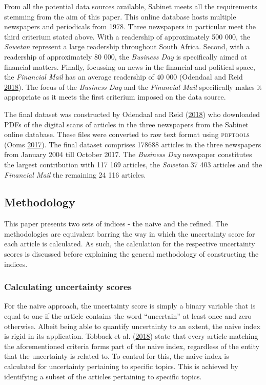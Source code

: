 \documentclass[11pt,preprint, authoryear]{elsarticle}
\numberwithin{equation}{section}
\numberwithin{figure}{section}
\numberwithin{table}{section}
\begin{document}
From all the potential data sources available, Sabinet meets all the
requirements stemming from the aim of this paper. This online database
hosts multiple newspapers and periodicals from 1978. Three newspapers in
particular meet the third criterium stated above. With a readership of
approximately 500 000, the \emph{Sowetan} represent a large readership
throughout South Africa. Second, with a readership of approximately 80
000, the \emph{Business Day} is specifically aimed at financial matters.
Finally, focussing on news in the financial and political space, the
\emph{Financial Mail} has an average readership of 40 000 (Odendaal and
Reid \protect\hyperlink{ref-Odendaal2018}{2018}). The focus of the
\emph{Business Day} and the \emph{Financial Mail} specifically makes it
appropriate as it meets the first criterium imposed on the data source.

The final dataset was constructed by Odendaal and Reid
(\protect\hyperlink{ref-Odendaal2018}{2018}) who downloaded PDFs of the
digital scans of articles in the three newspapers from the Sabinet
online database. These files were converted to raw text format using
\textsc{pdftools} (Ooms \protect\hyperlink{ref-Ooms2017}{2017}). The
final dataset comprises 178688 articles in the three newspapers from
January 2004 till October 2017. The \emph{Business Day} newspaper
constitutes the largest contribution with 117 169 articles, the
\emph{Sowetan} 37 403 articles and the \emph{Financial Mail} the
remaining 24 116 articles.

\subsection{\texorpdfstring{Methodology
\label{sec_method}}{Methodology }}\label{methodology}

This paper presents two sets
of indices - the naive and the refined. The methodologies are equivalent barring the way in which the uncertainty score for each article is calculated. As such, the calculation for the respective uncertainty scores is discussed before explaining the general
methodology of constructing the indices.

\subsubsection{\texorpdfstring{Calculating uncertainty scores
\label{ss_uncertaintyscore}}{Calculating uncertainty scores }}\label{calculating-uncertainty-scores}

For the naive approach, the uncertainty score is simply a binary
variable that is equal to one if the article contains the word
``uncertain'' at least once and zero otherwise. Albeit being able to
quantify uncertainty to an extent, the naive index is rigid in its
application. Tobback et al. (\protect\hyperlink{ref-Tobback2018}{2018})
state that every article matching the aforementioned criteria forms part
of the naive index, regardless of the entity that the uncertainty is
related to. To control for this, the naive index is calculated for
uncertainty pertaining to specific topics. This is achieved by
identifying a subset of the articles pertaining to specific topics. %
\end{document}
